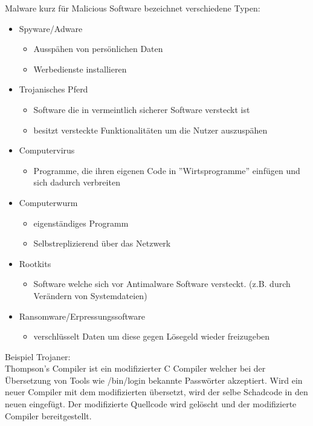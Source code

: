 \documentclass[a4paper,12pt,leqno]{article}
\begin{document}
Malware kurz für Malicious Software bezeichnet verschiedene Typen:
\begin{itemize}
\item Spyware/Adware
	\begin{itemize}
	\item Ausspähen von persönlichen Daten
	\item Werbedienste installieren
	\end{itemize}
\item Trojanisches Pferd
	\begin{itemize}
	\item Software die in vermeintlich sicherer Software versteckt ist
	\item besitzt versteckte Funktionalitäten um die Nutzer auszuspähen
	\end{itemize}
\item Computervirus
	\begin{itemize}
	\item Programme, die ihren eigenen Code in ''Wirtsprogramme'' einfügen und sich dadurch verbreiten
	\end{itemize}
\item Computerwurm
	\begin{itemize}
	\item eigenständiges Programm
	\item Selbstreplizierend über das Netzwerk
	\end{itemize}
\item Rootkits
	\begin{itemize}
	\item Software welche sich vor Antimalware Software versteckt. (z.B. durch Verändern von Systemdateien)
	\end{itemize}
\item Ransomware/Erpressungssoftware
	\begin{itemize}
	\item verschlüsselt Daten um diese gegen Lösegeld wieder freizugeben
	\end{itemize}
\end{itemize}
Beispiel Trojaner:\\
Thompson's Compiler ist ein modifizierter C Compiler welcher bei der Übersetzung von Tools wie /bin/login bekannte Passwörter akzeptiert. Wird ein neuer Compiler mit dem modifizierten übersetzt, wird der selbe Schadcode in den neuen eingefügt. Der modifizierte Quellcode wird gelöscht und der modifizierte Compiler bereitgestellt.\\
\end{document}
